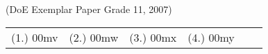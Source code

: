 \begin{eocexercises}{}
\begin{enumerate}
(DoE Exemplar Paper Grade 11, 2007)
\end{enumerate}

\practiceinfo

\begin{tabular}[h]{cccccc}
(1.) 00mv & (2.) 00mw & (3.) 00mx & (4.) 00my & 
 \end{tabular}
\end{eocexercises}
